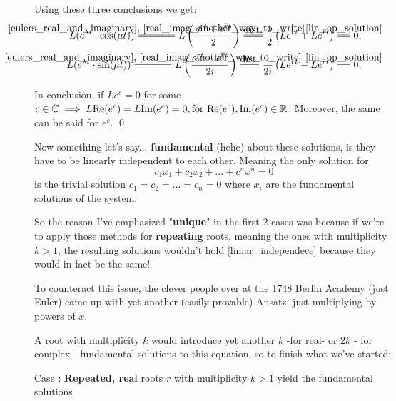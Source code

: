 \newcommand\byDistributivity{\stackrel{\mathclap{\normalfont\mbox{dist.}}}{=\joinrel=\joinrel=}}

\newcommand\operatorSatisfy{\stackrel{\mathclap{\normalfont\mbox{\ref{lin_op_solution}}}}{=\joinrel=}}

Using these three conclusions we get:
\begin{align*}
  L(e^{\lambda t} \cdot \text{cos}(\mu t)) \firstConclusion
  L\left(\frac{e^{rt}+e^{\overline{r}t}}{2} \right) \byDistributivity
  \frac{1}{2} \left( Le^{rt} + Le^{\overline{r}t} \right) \operatorSatisfy 0 , \\
  L(e^{\lambda t} \cdot \text{sin}(\mu t)) \firstConclusion
  L\left(\frac{e^{rt}-e^{\overline{r}t}}{2i} \right) \byDistributivity
  \frac{1}{2i} \left( Le^{rt} - Le^{\overline{r}t} \right) \operatorSatisfy 0 ,
\end{align*}

In conclusion, if $Le^c=0$ for some $c \in \mathbb{C} \implies L\text{Re}(e^c)= L\text{Im}(e^c)=0, \\
\text{for } \text{Re}(e^c), \text{Im}(e^c) \in \mathbb{R}$.
Moreover, the same can be said for $e^{\overline{c}}$. \qed

Now something let's say... \textbf{fundamental} (hehe) about these solutions, is they have to be linearly independent to each other. Meaning the only solution for
\begin{equation}\label{liniar_independece}
  c_1 x_1+c_2 x_2 + \dots + c^n x^n = 0
\end{equation}
is the trivial solution $c_1=c_2=\dots=c_n=0$ where $x_i$ are the fundamental solutions of the system.

So the reason I've emphasized "\textbf{unique}" in the first 2 cases was because if we're to apply those methods for \textbf{repeating} roots, meaning the ones with multiplicity $k>1$, the resulting solutions wouldn't hold \ref{liniar_independece} because they would in fact be the same!

To counteract this issue, the clever people over at the 1748 Berlin Academy (just Euler) came up with yet another (easily provable) Ansatz: just multiplying by powers of $x$.

A root with multiplicity $k$ would introduce yet another $k$ -for real- or $2k$ - for complex - fundamental solutions to this equation, so to finish what we've started:

Case : \textbf{Repeated, real} roots $r$ with multiplicity $k>1$ yield the fundamental solutions

